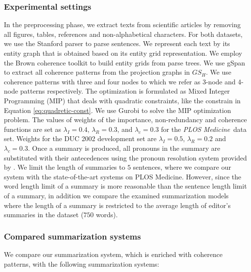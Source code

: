 \subsubsection{Experimental settings}
In the preprocessing phase, we extract texts from scientific articles by removing all figures, tables, references and \mbox{non-alphabetical} characters.
For both datasets, we use the Stanford parser \cite{klein03b} to parse sentences. 
We represent each text by its entity graph that is obtained based on its entity grid representation. 
We employ the Brown coherence toolkit \cite{elsner11b} to build entity grids from parse trees.  
We use gSpan \cite{yanxifeng02} to extract all coherence patterns from the projection graphs in $GS_H$. 
We use coherence patterns with three and four nodes to which we refer as 3-node and 4-node patterns respectively. 
The optimization is formulated as Mixed Integer Programming (MIP) that deals with quadratic constraints, like the constrain in Equation \ref{eq:quadretic-const}.  
We use Gurobi \cite{gurobi14} to solve the MIP optimization problem.
The values of weights of the importance, non-redundancy and coherence functions are set as 
$\lambda_{I}=0.4$, $\lambda_R=0.3$, and $\lambda_{c}=0.3$ for the \emph{PLOS Medicine}\ data set.  
Weights for the DUC 2002 development set are $\lambda_{I}=0.5$, $\lambda_R=0.2$ and $\lambda_{c}=0.3$.
Once a summary is produced, all pronouns in the summary are substituted with their antecedences using the pronoun resolution system provided by . 
We limit the length of summaries to $5$ sentences,  where we compare our system with the \mbox{state-of-the-art} systems on PLOS Medicine. 
However, since the word length limit of a summary is more reasonable than the sentence length limit of a summary, in addition we compare the examined summarization models where the length of a summary is restricted to the average length of editor's summaries in the dataset ($750$ words). 

\subsubsection{Compared summarization systems}
We compare our summarization system, which is enriched with coherence patterns, with the following summarization systems: 

